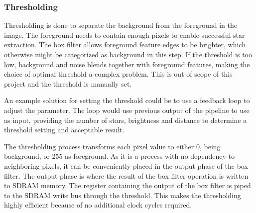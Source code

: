 \documentclass[12pt]{report}
\begin{document}
\subsubsection{Thresholding}
Thresholding is done to separate the background from the foreground in the image. The foreground needs to contain enough pixels to enable successful star extraction. The box filter allows foreground feature edges to be brighter, which otherwise might be categorized as background in this step. If the threshold is too low, background and noise blends together with foreground features, making the choice of optimal threshold a complex problem. This is out of scope of this project and the threshold is manually set. 
\par
An example solution for setting the threshold could be to use a feedback loop to adjust the parameter. The loop would use previous output of the pipeline to use as input, providing the number of stars, brightness and distance to determine a threshold setting and acceptable result.    
\par
The thresholding process transforms each pixel value to either 0, being background, or 255 as foreground. As it is a process with no dependency to neighboring pixels, it can be conveniently placed in the output phase of the box filter. The output phase is where the result of the box filter operation is written to SDRAM memory. The register containing the output of the box filter is piped to the SDRAM write bus through the threshold. This makes the thresholding highly efficient because of no additional clock cycles required.
\end{document}
